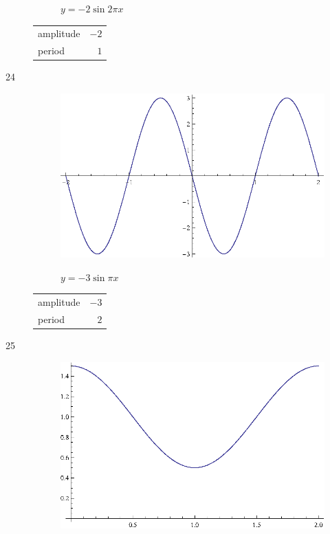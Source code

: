 \documentclass{exam}
\begin{document}
\begin{description}
\begin{figure}[H]
          $y = -2 \sin 2 \pi x$
        \end{figure}

        \begin{tabular}[H]{lr}
          \toprule
          amplitude & $-2$ \\
          period    & $1$ \\
          \bottomrule
        \end{tabular}

      \item[24]
        \begin{figure}[H]
          \centering
          \includegraphics[scale=0.9]{exercise24.eps}

          $y = -3 \sin \pi x$
        \end{figure}

        \begin{tabular}[H]{lr}
          \toprule
          amplitude & $-3$ \\
          period    & $2$ \\
          \bottomrule
        \end{tabular}

      \item[25]
        \begin{figure}[H]
          \centering
          \includegraphics[scale=0.9]{exercise25.eps}


\end{figure}
\end{description}
\end{document}

